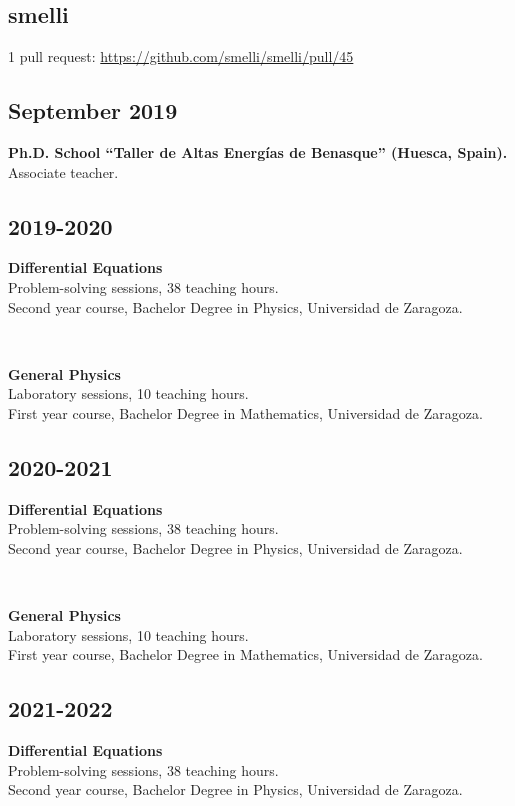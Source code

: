 \documentclass{cvf}
\begin{document}
\subsection{smelli}
1 pull request: \url{https://github.com/smelli/smelli/pull/45}


\subsection{September 2019}
\hspace{\parindent}\textbf{Ph.D. School ``Taller de Altas Energías de Benasque'' (Huesca, Spain).}\\
Associate teacher.

\subsection{2019-2020}
\hspace{\parindent}\textbf{Differential Equations}\\
Problem-solving sessions, 38 teaching hours.\\
Second year course, Bachelor Degree in Physics, Universidad de Zaragoza.

~

\textbf{General Physics}\\
Laboratory sessions, 10 teaching hours.\\
First year course, Bachelor Degree in Mathematics, Universidad de Zaragoza.

\subsection{2020-2021}
\hspace{\parindent}\textbf{Differential Equations}\\
Problem-solving sessions, 38 teaching hours.\\
Second year course, Bachelor Degree in Physics, Universidad de Zaragoza.

~

\textbf{General Physics}\\
Laboratory sessions, 10 teaching hours.\\
First year course, Bachelor Degree in Mathematics, Universidad de Zaragoza.

\subsection{2021-2022}
\hspace{\parindent}\textbf{Differential Equations}\\
Problem-solving sessions, 38 teaching hours.\\
Second year course, Bachelor Degree in Physics, Universidad de Zaragoza.
\end{document}
